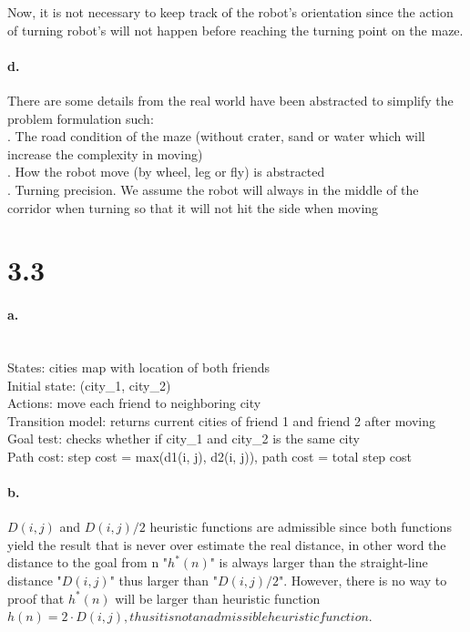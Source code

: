\documentclass[a4paper]{article}
\begin{document}
\indent Now, it is not necessary to keep track of the robot's orientation since the action of turning robot's will not happen before reaching the turning point on the maze.

\paragraph{d.}
There are some details from the real world have been abstracted to simplify the problem formulation such: \\
. The road condition of the maze (without crater, sand or water which will increase the complexity in moving) \\
. How the robot move (by wheel, leg or fly) is abstracted \\
. Turning precision. We assume the robot will always in the middle of the corridor when turning so that it will not hit the side when moving

\section*{3.3}

\paragraph{a.} ~\\
\indent States: cities map with location of both friends \\
\indent Initial state: (city\_1, city\_2) \\
\indent Actions: move each friend to neighboring city \\
\indent Transition model: returns current cities of friend 1 and friend 2 after moving \\
\indent Goal test: checks whether if city\_1 and city\_2 is the same city \\
\indent Path cost: step cost = max(d1(i, j), d2(i, j)), path cost = total step cost \\

\paragraph{b.} $D(i, j)$ and $D(i, j)/2$ heuristic functions are admissible since both functions yield the result that is never over estimate the real distance, in other word the distance to the goal from n "$h^{*}(n)$" is always larger than the straight-line distance "$D(i, j)$" thus larger than "$D(i, j)/2$". However, there is no way to proof that $h^{*}(n)$ will be larger than heuristic function $h(n) = 2 \cdot D(i, j), thus it is not an admissible heuristic function$.
\end{document}
